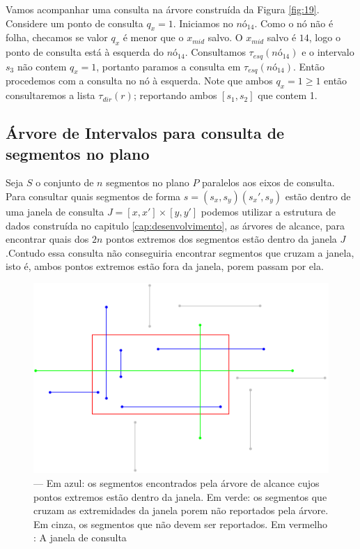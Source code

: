 Vamos acompanhar uma consulta na árvore construída da Figura \ref{fig:19}. Considere um ponto de consulta $q_x=1$. Iniciamos no $nó_14$. Como o nó não é folha, checamos se valor $q_x$ é menor que o $x_{mid}$ salvo. O $x_{mid}$ salvo é $14$, logo o ponto de consulta está à esquerda do $nó_14$. Consultamos $\tau_{esq}(nó_{14})$ e o intervalo $s_3$ não contem $q_x = 1$, portanto paramos a consulta em $\tau_{esq}(nó_{14})$. Então procedemos com a consulta no nó à esquerda. Note que ambos $q_x=1 \geq 1$ então consultaremos a lista $\tau_{dir}(r)$; reportando ambos $[s_1,s_2]$ que contem 1.

\subsection{Árvore de Intervalos para consulta de segmentos no plano}

Seja $S$ o conjunto de $n$ segmentos no plano $P$ paralelos aos eixos de consulta. Para consultar quais segmentos de forma $s=(s_x,s_y)(s_x', s_y)$ estão dentro de uma janela de consulta $J = [x, x'] \times [y, y']$ podemos utilizar a estrutura de dados construída no capitulo \ref{cap:desenvolvimento}, as árvores de alcance, para encontrar quais dos $2n$ pontos extremos dos segmentos estão dentro da janela $J$.Contudo essa consulta não conseguiria encontrar segmentos que cruzam a janela, isto é, ambos pontos extremos estão fora da janela, porem passam por ela.

\begin{figure}[h!]
    \begin{center}
        \includegraphics{images/interval_tree7.pdf}
    \end{center}
    \caption{ — Em azul: os segmentos encontrados pela árvore de alcance cujos pontos extremos estão dentro da janela. Em verde: os segmentos que cruzam as extremidades da janela porem não reportados pela árvore. Em cinza, os segmentos que não devem ser reportados. Em vermelho : A janela de consulta}
    \label{fig:21}
\end{figure}

